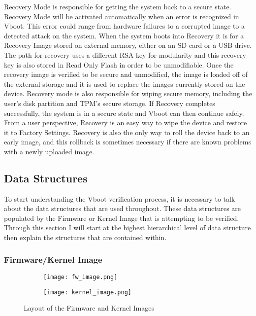 \documentclass[../report.tex]{subfiles}
\begin{document}
Recovery Mode is responsible for getting the system back to a secure state.
Recovery Mode will be activated automatically when an error is recognized in Vboot.
This error could range from hardware failures to a corrupted image to a detected attack on the system.
When the system boots into Recovery it is for a Recovery Image stored on external memory, either on an SD card or a USB drive.
The path for recovery uses a different RSA key for modularity and this recovery key is also stored in Read Only Flash in order to be unmodifiable.
Once the recovery image is verified to be secure and unmodified, the image is loaded off of the external storage and it is used to replace the images currently stored on the device.
Recovery mode is also responsible for wiping secure memory, including the user's disk partition and TPM's secure storage.
If Recovery completes successfully, the system is in a secure state and Vboot can then continue safely.
From a user perspective, Recovery is an easy way to wipe the device and restore it to Factory Settings.
Recovery is also the only way to roll the device back to an early image, and this rollback is sometimes necessary if there are known problems with a newly uploaded image.

\subsection{Data Structures}\label{sec:data-structures}

To start understanding the Vboot verification process, it is necessary to talk about the data structures that are used throughout. 
These data structures are populated by the Firmware or Kernel Image that is attempting to be verified.
Through this section I will start at the highest hierarchical level of data structure then explain the structures that are contained within.

\subsubsection{Firmware/Kernel Image}

\begin{figure}
\begin{subfigure}{.5\textwidth}
  \centering
  \texttt{[image: fw\_image.png]}
\end{subfigure}%
\begin{subfigure}{.5\textwidth}
  \centering
  \texttt{[image: kernel\_image.png]}
\end{subfigure}
\caption{Layout of the Firmware and Kernel Images~\cite{vboot-data-structures}}
\label{fig:vboot_images}
\end{figure}
\end{document}
